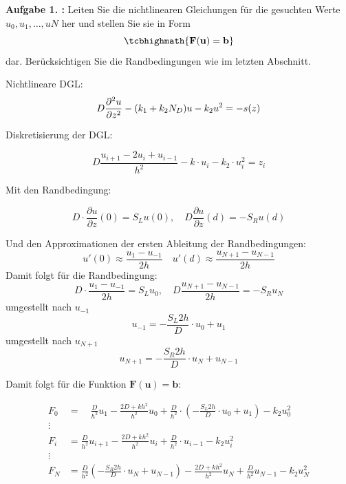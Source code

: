 \begin{mybox}
	\textbf{Aufgabe 1. :} Leiten Sie die nichtlinearen Gleichungen für die
	gesuchten Werte $u_0,u_1,\dots ,uN$ her und stellen Sie
	sie in Form
	\begin{equation*}
		\tcbhighmath{\mathbf{F}(\mathbf{u})=\mathbf{b}}
	\end{equation*}
	dar. Berücksichtigen Sie die Randbedingungen wie im letzten Abschnitt.
	\cite{Prof.Dr.AndreasZeiser.April2021}
\end{mybox}
Nichtlineare DGL:
\begin{equation}
	D\pdv[2]{u}{z}-(k_1+k_2N_D)u-k_2u^2=-s(z)
\end{equation}

Diskretisierung der DGL:

\begin{equation}
	D\frac{u_{i+1}-2u_i+u_{i-1}}{h^2}-k\cdot u_i-k_2 \cdot u_i^2=z_i
\end{equation}

Mit den Randbedingung:

\begin{equation}
	D\cdot \frac{\partial u}{\partial z}(0)=S_Lu(0),\quad D\frac{\partial
		u}{\partial z}(d)=-S_Ru(d)
\end{equation}

Und den Approximationen der ersten Ableitung der  Randbedingungen:
\begin{equation}
	u'(0)\approx \frac{u_1-u_{-1}}{2h} \quad u'(d)\approx
	\frac{u_{N+1}-u_{N-1}}{2h}
\end{equation}
Damit folgt für die Randbedingung:
\begin{equation}
	D\cdot \frac{u_1-u_{-1}}{2h}=S_Lu_0,\quad
	D\frac{u_{N+1}-u_{N-1}}{2h}=-S_Ru_N
\end{equation}
umgestellt nach $u_{-1}$
\begin{equation}
	u_{-1}=-\frac{S_L 2h}{D}\cdot u_0+u_1
\end{equation}
umgestellt nach $u_{N+1}$
\begin{equation}
	u_{N+1}=-\frac{S_R2h}{D}\cdot u_N+u_{N-1}
\end{equation}

Damit folgt für die Funktion $\mathbf{F}(\mathbf{u})=\mathbf{b}$:

\begin{align*}
	F_0 & = \quad
	\frac{D}{h^2}u_1-\frac{2D+kh^2}{h^2}u_0+\frac{D}{h^2}\cdot\left( -\frac{S_L
	2h}{D}\cdot u_0+u_1\right) -k_2u_0^2                                  \\
	\vdots                                                                \\
	F_i & =	\frac{D}{h^2}u_{i+1}-\frac{2D+kh^2}{h^2}u_i+\frac{D}{h^2}\cdot
	u_{i-1} -k_2u_i^2                                                     \\
	\vdots                                                                \\
	F_N & = \frac{D}{h^2}\left( -\frac{S_R2h}{D}\cdot u_N+u_{N-1}\right)
	-\frac{2D+kh^2}{h^2}u_N+\frac{D}{h^2} u_{N-1}-k_2u^2_N                \\
\end{align*}

